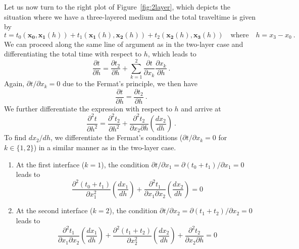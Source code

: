 Let us now turn to the right plot of Figure~\ref{fig:2layer}, which depicts the situation where we have a three-layered medium and the total traveltime is given by
\begin{equation}
\label{eq:time3l}
t = t_0(\mathbf{x_0},\mathbf{x_1}(h)) + t_1(\mathbf{x_1}(h),\mathbf{x_2}(h)) + t_2(\mathbf{x_2}(h),\mathbf{x_3}(h)) \quad\text{where}\quad h = x_3-x_0~.
\end{equation}
We can proceed along the same line of argument as in the two-layer case and differentiating the total time with respect to $h$, which leads to
\begin{equation}
\frac{\partial t}{\partial h} = \frac{\partial t_2}{\partial h} +  \sum^2_{k=1} \frac{\partial t}{\partial x_k}  \frac{\partial x_k}{\partial h}~.
\end{equation}
Again, $\partial t / \partial x_k = 0$ due to the Fermat's principle, we then have
\begin{equation}
\frac{\partial t}{\partial h}  = \frac{\partial t_2}{\partial h}~.
\end{equation}
We further differentiate the expression with respect to $h$ and arrive at 
\begin{equation}
\label{eq:2d3l}
\frac{\partial^2 t}{\partial h^2} = \frac{\partial^2 t_2}{\partial h^2} + \frac{\partial^2 t_2}{\partial x_2 \partial h}\left( \frac{d x_2}{d h}\right) ~.
\end{equation}
To find $d x_2/ d h$, we differentiate the Fermat's conditions ($\partial t / \partial x_k = 0$ for $k \in \{1,2\}$) in a similar manner as in the two-layer case. 
\begin{enumerate}
\item  At the first interface ($k=1$), the condition $\partial t / \partial x_1 =  \partial ( t_0+t_1) / \partial x_1  =  0$ leads to 
\begin{equation}
\label{eq:cond1}
\frac{\partial^2 (t_0 + t_1)}{\partial x_1^2} \left( \frac{d x_1}{d h}\right) + \frac{\partial^2 t_1}{\partial x_1 \partial x_2} \left( \frac{d x_2}{d h}\right) = 0
\end{equation}
\item  At the second interface ($k=2$), the condition $\partial t / \partial x_2 =  \partial ( t_1+t_2) / \partial x_2  =  0$ leads to 
\begin{equation}
\label{eq:cond2}
\frac{\partial^2 t_1}{\partial x_1 \partial x_2} \left( \frac{d x_1}{d h}\right) + \frac{\partial^2 (t_1 + t_2)}{\partial x_2^2} \left( \frac{d x_2}{d h}\right) + \frac{\partial^2 t_2}{\partial x_2 \partial h} = 0
\end{equation}
\end{enumerate}
